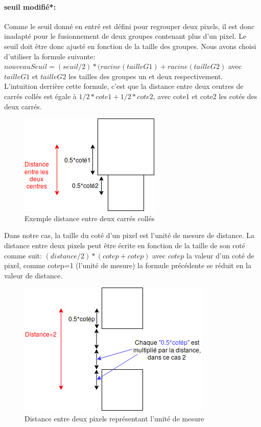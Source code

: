 \documentclass[12pt]{report}
\begin{document}
\paragraph{seuil modifié*:}Comme le seuil donné en entré est défini pour regrouper deux pixels, il est donc inadapté pour le fusionnement de deux groupes contenant plus d’un pixel. Le seuil doit être donc ajusté en fonction de la taille des groupes. Nous avons choisi d’utiliser la formule suivante: \textbf{$nouveauSeuil = (seuil/2)*(racine(tailleG1)+racine(tailleG2)$} avec \textbf{$tailleG1$} et \textbf{$tailleG2$} les tailles des groupes un et deux respectivement.\\
L’intuition derrière cette formule, c’est que la distance entre deux centres de carrés collés est égale à $1/2*cote1+1/2*cote2$, avec cote1 et cote2 les cotés des deux carrés.
\begin{figure}[H]
	\centering
	\includegraphics[scale=0.75]{imgs/distanceSquares.png}
	\caption{Exemple distance entre deux carrés collés}
	\label{fig:DistanceSquares}
\end{figure}
Dans notre cas, la taille du coté d’un pixel est l’unité de mesure de distance. La distance entre deux pixels peut être écrite en fonction de la taille de son coté comme suit: \textbf{$(distance/2)*(cotep+cotep)$} avec \textbf{$cotep$} la valeur d’un coté de pixel, comme cotep=1 (l’unité de mesure) la formule précédente se réduit en la valeur de distance.
\begin{figure}[H]
	\centering
	\includegraphics[scale=0.75]{imgs/distancePixels.png}
	\caption{Distance entre deux pixels représentant l'unité de mesure}
	\label{fig:DistancePixels}
\end{figure}
\end{document}
